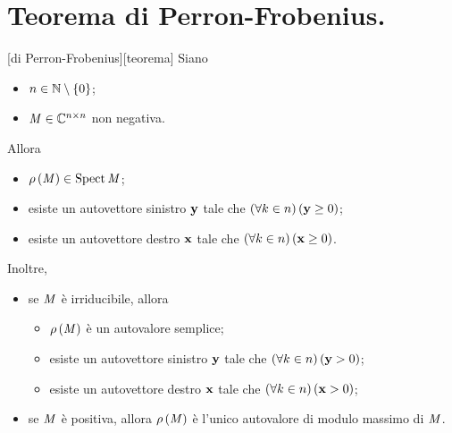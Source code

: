 \section{Teorema di Perron-Frobenius.}
\label{CalcoloScientifico_TeoremaDiPerronFrobenius}
\begin{Theorem}
  [di Perron-Frobenius][teorema]
  Siano
  \begin{itemize}
    \item $n \in \mathbb{N} \setminus \lbrace 0 \rbrace$;
    \item $\mathit{M} \in \mathbb{C}^{n \times n}$ non negativa.
  \end{itemize}
  Allora
  \begin{itemize}
    \item $\rho \left ( \mathit{M} \right ) \in \operatorname{Spect}{\mathit{M}}$;
    \item esiste un autovettore sinistro $\VarEigenvector$ tale che
      $\ForAll{k \in n}{\VarEigenvector \geq 0}$;
    \item esiste un autovettore destro $\Eigenvector$ tale che
      $\ForAll{k \in n}{\Eigenvector \geq 0}$.
  \end{itemize}
  Inoltre,
  \begin{itemize}
    \item se $\mathit{M}$ \`e irriducibile, allora
      \begin{itemize}
        \item $\rho \left ( \mathit{M} \right )$ \`e un autovalore semplice;
        \item esiste un autovettore sinistro $\VarEigenvector$ tale che
          $\ForAll{k \in n}{\VarEigenvector > 0}$;
        \item esiste un autovettore destro $\Eigenvector$ tale che
          $\ForAll{k \in n}{\Eigenvector > 0}$;
      \end{itemize}
      \item se $\mathit{M}$ \`e positiva, allora
        $\rho \left ( \mathit{M} \right )$
        \`e l'unico autovalore di modulo massimo di $\mathit{M}$.
  \end{itemize}
\end{Theorem}

